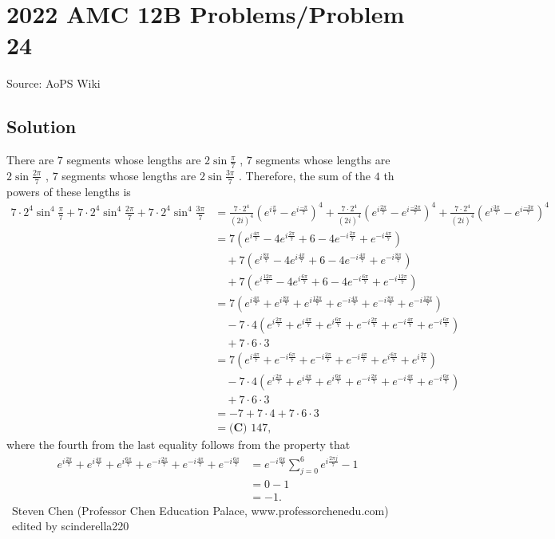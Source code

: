 \documentclass[12pt]{article}
\begin{document}
\section*{{2022 AMC 12B Problems/Problem 24}}
Source: AoPS Wiki

\subsection*{Solution}
There are $7$ segments whose lengths are $2 \sin \frac{\pi}{7}$ , $7$ segments whose lengths are $2 \sin \frac{2 \pi}{7}$ , $7$ segments whose lengths are $2 \sin \frac{3\pi}{7}$ . Therefore, the sum of the $4$ th powers of these lengths is \begin{align*} 7 \cdot 2^4 \sin^4 \frac{\pi}{7} + 7 \cdot 2^4 \sin^4 \frac{2 \pi}{7} + 7 \cdot 2^4 \sin^4 \frac{3 \pi}{7} & = \frac{7 \cdot 2^4}{(2i)^4} \left( e^{i \frac{\pi}{7}} - e^{i \frac{-\pi}{7}} \right)^4 + \frac{7 \cdot 2^4}{(2i)^4} \left( e^{i \frac{2 \pi}{7}} - e^{i \frac{-2 \pi}{7}} \right)^4 + \frac{7 \cdot 2^4}{(2i)^4} \left( e^{i \frac{3 \pi}{7}} - e^{i \frac{-3 \pi}{7}} \right)^4 \\ & = 7 \left( e^{i \frac{4 \pi}{7}} - 4 e^{i \frac{2 \pi}{7}} + 6 - 4 e^{- i \frac{2 \pi}{7}} + e^{- i \frac{4 \pi}{7}} \right) \\ & \quad + 7 \left( e^{i \frac{8 \pi}{7}} - 4 e^{i \frac{4 \pi}{7}} + 6 - 4 e^{- i \frac{4 \pi}{7}} + e^{- i \frac{8 \pi}{7}} \right) \\ & \quad + 7 \left( e^{i \frac{12 \pi}{7}} - 4 e^{i \frac{6 \pi}{7}} + 6 - 4 e^{- i \frac{6 \pi}{7}} + e^{- i \frac{12 \pi}{7}} \right) \\ & = 7 \left( e^{i \frac{4 \pi}{7}} + e^{i \frac{8 \pi}{7}} + e^{i \frac{12 \pi}{7}} + e^{-i \frac{4 \pi}{7}} + e^{-i \frac{8 \pi}{7}} + e^{-i \frac{12 \pi}{7}} \right) \\ & \quad - 7 \cdot 4 \left( e^{i \frac{2 \pi}{7}} + e^{i \frac{4 \pi}{7}} + e^{i \frac{6 \pi}{7}} + e^{-i \frac{2 \pi}{7}} + e^{-i \frac{4 \pi}{7}} + e^{-i \frac{6 \pi}{7}} \right) \\ & \quad + 7 \cdot 6 \cdot 3 \\ & = 7 \left( e^{i \frac{4 \pi}{7}} + e^{-i \frac{6 \pi}{7}} + e^{-i \frac{2 \pi}{7}} + e^{-i \frac{4 \pi}{7}} + e^{i \frac{6 \pi}{7}} + e^{i \frac{2 \pi}{7}} \right) \\ & \quad - 7 \cdot 4 \left( e^{i \frac{2 \pi}{7}} + e^{i \frac{4 \pi}{7}} + e^{i \frac{6 \pi}{7}} + e^{-i \frac{2 \pi}{7}} + e^{-i \frac{4 \pi}{7}} + e^{-i \frac{6 \pi}{7}} \right) \\ & \quad + 7 \cdot 6 \cdot 3 \\ & = -7 + 7 \cdot 4 + 7 \cdot 6 \cdot 3 \\ & = \boxed{\textbf{(C) }147}, \end{align*} where the fourth from the last equality follows from the property that \begin{align*} e^{i \frac{2 \pi}{7}} + e^{i \frac{4 \pi}{7}} + e^{i \frac{6 \pi}{7}} + e^{-i \frac{2 \pi}{7}} + e^{-i \frac{4 \pi}{7}} + e^{-i \frac{6 \pi}{7}} & = e^{-i \frac{6 \pi}{7}} \sum_{j=0}^6 e^{i \frac{2 \pi j}{7}} - 1 \\ & = 0 - 1 \\ & = -1 . \end{align*} ~Steven Chen (Professor Chen Education Palace, www.professorchenedu.com) ~edited by scinderella220
\end{document}
